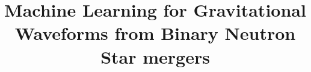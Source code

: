 \documentclass[11pt,a4paper]{book}
\title{Machine Learning for Gravitational Waveforms from Binary Neutron Star mergers}
\begin{document}
\maketitle









\appendix







\section{}
\subsection{}
\subsubsection{}
\paragraph{}

\tableofcontents

\printbibliography
\end{document}
